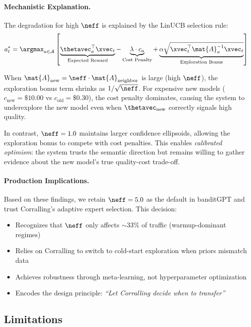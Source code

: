 \paragraph{Mechanistic Explanation.}
The degradation for high $\neff$ is explained by the LinUCB selection rule:
\[
a_t^* = \argmax_{a \in \mathcal{A}} \left[ \underbrace{\thetavec_a^\top \xvec_t}_{\text{Expected Reward}} - \underbrace{\lambda \cdot c_a}_{\text{Cost Penalty}} + \underbrace{\alpha \sqrt{\xvec_t^\top \mat{A}_a^{-1} \xvec_t}}_{\text{Exploration Bonus}} \right]
\]

When $\mat{A}_{\text{new}} = \neff \cdot \mat{A}_{\text{neighbor}}$ is large (high $\neff$), the exploration bonus term shrinks as $1/\sqrt{\neff}$. For expensive new models ($c_{\text{new}} = \$10.00$ vs $c_{\text{old}} = \$0.30$), the cost penalty dominates, causing the system to underexplore the new model even when $\thetavec_{\text{new}}$ correctly signals high quality.

In contrast, $\neff=1.0$ maintains larger confidence ellipsoids, allowing the exploration bonus to compete with cost penalties. This enables \textit{calibrated optimism}: the system trusts the semantic direction but remains willing to gather evidence about the new model's true quality-cost trade-off.

\paragraph{Production Implications.}
Based on these findings, we retain $\neff=5.0$ as the default in banditGPT and trust Corralling's adaptive expert selection. This decision:
\begin{itemize}[leftmargin=*, itemsep=2pt]
    \item Recognizes that $\neff$ only affects $\sim$33\% of traffic (warmup-dominant regimes)
    \item Relies on Corralling to switch to cold-start exploration when priors mismatch data
    \item Achieves robustness through meta-learning, not hyperparameter optimization
    \item Encodes the design principle: \textit{``Let Corralling decide when to transfer''}
\end{itemize}

\subsection{Limitations}
\label{sec:limitations}

